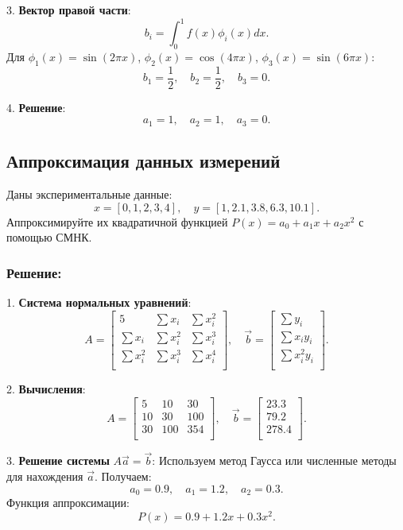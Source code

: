 3. \textbf{Вектор правой части}:
\[
b_i = \int_0^1 f(x) \phi_i(x) dx.
\]
Для $\phi_1(x) = \sin(2\pi x)$, $\phi_2(x) = \cos(4\pi x)$, $\phi_3(x) = \sin(6\pi x)$:
\[
b_1 = \frac{1}{2}, \quad b_2 = \frac{1}{2}, \quad b_3 = 0.
\]

4. \textbf{Решение}:
\[
a_1 = 1, \quad a_2 = 1, \quad a_3 = 0.
\]

\subsection{Аппроксимация данных измерений}
Даны экспериментальные данные:
\[
x = [0, 1, 2, 3, 4], \quad y = [1, 2.1, 3.8, 6.3, 10.1].
\]
Аппроксимируйте их квадратичной функцией $P(x) = a_0 + a_1 x + a_2 x^2$ с помощью СМНК.

\subsubsection*{Решение:}
1. \textbf{Система нормальных уравнений}:
\[
A = \begin{bmatrix}
5 & \sum x_i & \sum x_i^2 \\
\sum x_i & \sum x_i^2 & \sum x_i^3 \\
\sum x_i^2 & \sum x_i^3 & \sum x_i^4 \\
\end{bmatrix}, \quad 
\vec{b} = \begin{bmatrix}
\sum y_i \\
\sum x_i y_i \\
\sum x_i^2 y_i \\
\end{bmatrix}.
\]

2. \textbf{Вычисления}:
\[
A = \begin{bmatrix}
5 & 10 & 30 \\
10 & 30 & 100 \\
30 & 100 & 354 \\
\end{bmatrix}, \quad 
\vec{b} = \begin{bmatrix}
23.3 \\
79.2 \\
278.4 \\
\end{bmatrix}.
\]

3. \textbf{Решение системы} $A \vec{a} = \vec{b}$:
Используем метод Гаусса или численные методы для нахождения $\vec{a}$. Получаем:
\[
a_0 = 0.9, \quad a_1 = 1.2, \quad a_2 = 0.3.
\]
Функция аппроксимации:
\[
P(x) = 0.9 + 1.2x + 0.3x^2.
\]
